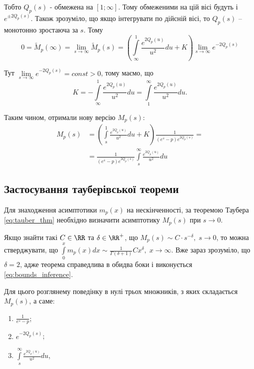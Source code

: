 Тобто $Q_p(s)$ - обмежена на $[1; \infty]$. Тому обмеженими на цій вісі будуть і $e^{\pm 2Q_p(s)}$. Також зрозуміло, що якщо інтегрувати по дійсній вісі, то $Q_p(s)$ – монотонно зростаюча за $s$. Тому
\begin{equation}
0 = \tilde M_p(\infty) = \lim_{s\rightarrow \infty} \tilde M_p(s) = \left( \int\limits_\infty^1 \frac{e^{2Q_p(u)}}{u^2} du + K \right) \lim_{s\rightarrow \infty} e^{- 2Q_p(s)}
\end{equation}

Тут $\lim\limits_{s\rightarrow \infty} e^{- 2Q_p(s)} = const > 0$, тому маємо, що
\begin{equation}
K = -  \int\limits_\infty^1 \frac{e^{2Q_p(u)}}{u^2} du =  \int\limits_1^\infty \frac{e^{2Q_p(u)}}{u^2} du.
\end{equation}

Таким чином, отримали нову версію $M_{p}(s)$:
\begin{equation}
\begin{split}
\label{eq:model_laplace_sol}
M_p(s)&= \left( \int\limits_s^1 \frac{e^{2Q_p(u)}}{u^2} du + K \right) \frac{1}{(e^s - p)  e^{2Q_p(s)}}
= \\
&=\frac{1}{(e^s - p)  e^{2Q_p(s)}} \int\limits_s^\infty \frac{e^{2Q_p(u)}}{u^2} du
\end{split}
\end{equation}

\subsection{Застосування тауберівської теореми}

Для знаходження асимптотики $m_p(x)$ на нескінченності, за теоремою Таубера \eqref{eq:tauber_thm} необхідно визначити асимптотику $M_p(s)$ при $s \rightarrow 0$.

Якщо знайти такі $C \in \RR$ та $\delta \in \RR^+$, що $M_p(s) \sim C \cdot s^{-\delta}, \; s \rightarrow 0$, то можна стверджувати, що $\int\limits_0^x m_p(x) dx \sim \frac{1}{\Gamma(\delta + 1)} C x^\delta, \; x \rightarrow \infty$. Вже зараз зрозуміло, що $\delta = 2$, адже теорема справедлива в обидва боки і виконується \eqref{eq:bounds_inference}.

Для цього розглянему поведінку в нулі трьох множників, з яких складається $M_p(s)$, а саме:
\begin{enumerate}
	\item $\frac{1}{e^s - p}$;
	\item $e^{-2Q_p(s)}$;
	\item $\int\limits_s^\infty \frac{e^{2Q_p(u)}}{u^2} du$,
\end{enumerate}

